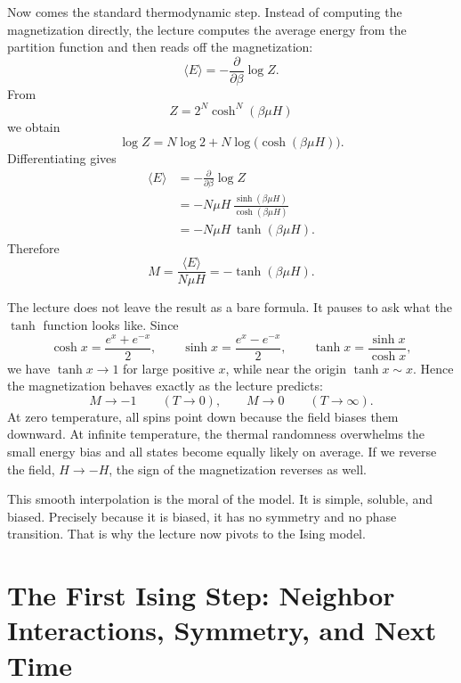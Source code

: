 Now comes the standard thermodynamic step. Instead of computing the magnetization directly, the lecture computes the average energy from the partition function and then reads off the magnetization:
\begin{equation}
\langle E\rangle=-\frac{\partial}{\partial\beta}\log Z.
\end{equation}
From
\begin{equation}
Z=2^N\cosh^N(\beta\mu H)
\end{equation}
we obtain
\begin{equation}
\log Z = N\log 2 + N\log\!\bigl(\cosh(\beta\mu H)\bigr).
\end{equation}
Differentiating gives
\begin{align}
\langle E\rangle
&=-\frac{\partial}{\partial\beta}\log Z \\
&=-N\mu H\,\frac{\sinh(\beta\mu H)}{\cosh(\beta\mu H)} \\
&=-N\mu H\,\tanh(\beta\mu H).
\end{align}
Therefore
\begin{equation}
M=\frac{\langle E\rangle}{N\mu H}=-\tanh(\beta\mu H).
\end{equation}

The lecture does not leave the result as a bare formula. It pauses to ask what the \(\tanh\) function looks like. Since
\begin{equation}
\cosh x=\frac{e^x+e^{-x}}{2},
\qquad
\sinh x=\frac{e^x-e^{-x}}{2},
\qquad
\tanh x=\frac{\sinh x}{\cosh x},
\end{equation}
we have \(\tanh x\to 1\) for large positive \(x\), while near the origin \(\tanh x\sim x\). Hence the magnetization behaves exactly as the lecture predicts:
\begin{equation}
M \to -1 \qquad (T\to 0),
\qquad
M \to 0 \qquad (T\to \infty).
\end{equation}
At zero temperature, all spins point down because the field biases them downward. At infinite temperature, the thermal randomness overwhelms the small energy bias and all states become equally likely on average. If we reverse the field, \(H\to -H\), the sign of the magnetization reverses as well.

This smooth interpolation is the moral of the model. It is simple, soluble, and biased. Precisely because it is biased, it has no symmetry and no phase transition. That is why the lecture now pivots to the Ising model.

\section{The First Ising Step: Neighbor Interactions, Symmetry, and Next Time}

